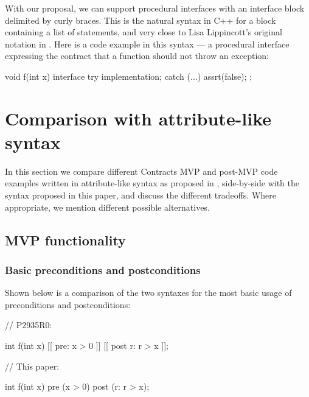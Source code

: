 With our proposal, we can support procedural interfaces with an interface block delimited by curly braces. This is the natural syntax in C++ for a block containing a list of statements, and very close to Lisa Lippincott's original notation in \cite{P0465R0}. Here is a code example in this syntax --- a procedural interface expressing the contract that a function should not throw an exception:

\vspace{2mm}
\begin{codeblock}
void f(int x)
interface {
  try {
    implementation;
  } 
  catch (...) {
    assrt(false);
  }
};
\end{codeblock}


\section{Comparison with attribute-like syntax}

In this section we compare different Contracts MVP and post-MVP code examples written in attribute-like syntax as proposed in \cite{P2935R0}, side-by-side with the syntax proposed in this paper, and discuss the different tradeoffs. Where appropriate, we mention different possible alternatives.

\subsection{MVP functionality}

\subsubsection{Basic preconditions and postconditions}
Shown below is a comparison of the two syntaxes for the most basic usage of preconditions and postconditions:

\begin{minipage}{8cm}
\begin{codeblock}
// P2935R0:

int f(int x) 
  [[ pre: x > 0 ]]
  [[ post r: r > x ]];
\end{codeblock}
\end{minipage}
\begin{minipage}{8cm}
\begin{codeblock}
// This paper:

int f(int x) 
  pre (x > 0)
  post (r: r > x);
\end{codeblock}
\end{minipage}

